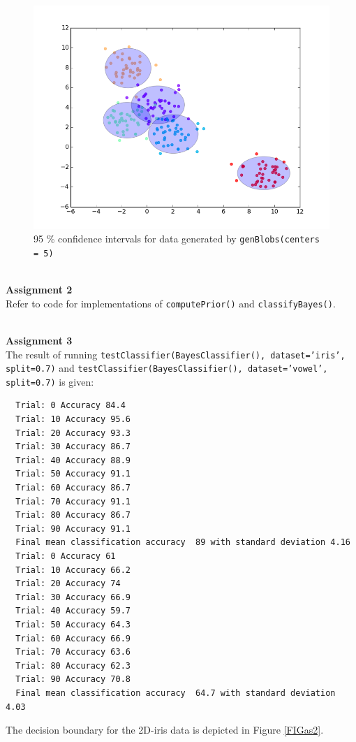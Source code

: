 \documentclass[a4paper,10pt]{article}
\begin{document}
\FloatBarrier
\begin{figure}[h!]
  \center
  \includegraphics[width = 150mm]{figure_1.png}
  \vspace{-15mm}

  \begin{minipage}[t]{95mm}
    \caption{
      95 \% confidence intervals for data generated by \texttt{genBlobs(centers = 5)}
    }
    \label{FIGas1}
  \end{minipage}
\end{figure}

\FloatBarrier
$ $\\
\textbf{Assignment 2}
\\
Refer to code for implementations of \texttt{computePrior()} and \texttt{classifyBayes()}.



$ $\\
\textbf{Assignment 3}\\
The result of running \texttt{testClassifier(BayesClassifier(), dataset='iris', split=0.7)} and 
\texttt{testClassifier(BayesClassifier(), dataset='vowel', split=0.7)}
is given:
\begin{framed}
  \begin{scriptsize}
  \begin{verbatim}
  Trial: 0 Accuracy 84.4
  Trial: 10 Accuracy 95.6
  Trial: 20 Accuracy 93.3
  Trial: 30 Accuracy 86.7
  Trial: 40 Accuracy 88.9
  Trial: 50 Accuracy 91.1
  Trial: 60 Accuracy 86.7
  Trial: 70 Accuracy 91.1
  Trial: 80 Accuracy 86.7
  Trial: 90 Accuracy 91.1
  Final mean classification accuracy  89 with standard deviation 4.16
  Trial: 0 Accuracy 61
  Trial: 10 Accuracy 66.2
  Trial: 20 Accuracy 74
  Trial: 30 Accuracy 66.9
  Trial: 40 Accuracy 59.7
  Trial: 50 Accuracy 64.3
  Trial: 60 Accuracy 66.9
  Trial: 70 Accuracy 63.6
  Trial: 80 Accuracy 62.3
  Trial: 90 Accuracy 70.8
  Final mean classification accuracy  64.7 with standard deviation 4.03
  \end{verbatim}
  \end{scriptsize}
\end{framed}
\noindent
The decision boundary for the 2D-iris data is depicted in Figure \ref{FIGas2}.
\end{document}
